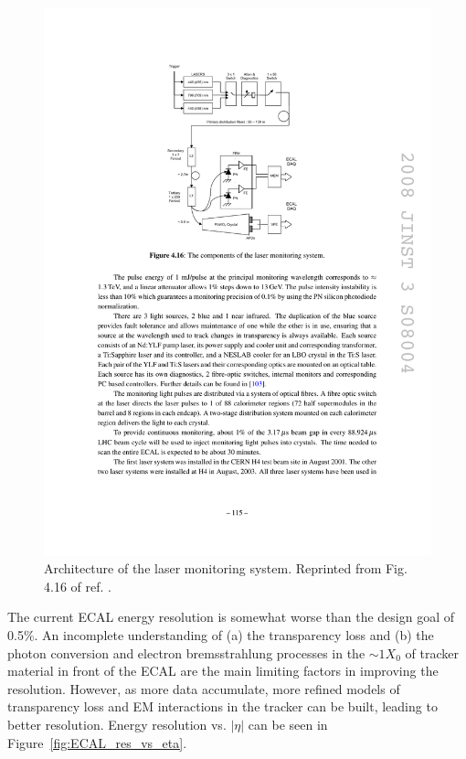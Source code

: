 \documentclass[dissertation.tex]{subfiles}
\begin{document}
\begin{figure}
	\centering
	\includegraphics[scale=1.0]{ECAL_laser_system}
	\caption{Architecture of the laser monitoring system.  Reprinted from Fig. 4.16 of ref. \cite{1748-0221-3-08-S08004}.}
	\label{fig:ECAL_laser_system}
\end{figure}

The current ECAL energy resolution is somewhat worse than the design goal of 0.5\%.  An incomplete understanding of (a) the transparency loss and (b) the photon conversion and electron bremsstrahlung processes in the $\sim1X_{0}$ of tracker material in front of the ECAL are the main limiting factors in improving the resolution.  However, as more data accumulate, more refined models of transparency loss and EM interactions in the tracker can be built, leading to better resolution.  Energy resolution vs. $|\eta|$ can be seen in Figure~\ref{fig:ECAL_res_vs_eta}.
\end{document}
